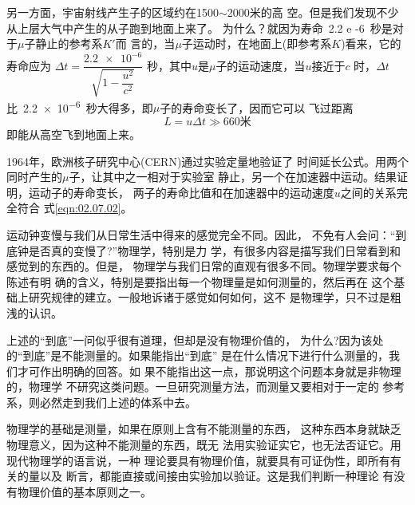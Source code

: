\vspace{-0.2em}另一方面，宇宙射线产生子的区域约在1500$\sim$2000米的高
空。但是我们发现不少从上层大气中产生的从子跑到地面上来了。
为什么？就因为寿命~\num{2.2 e -6}~秒是对于$\mu$子静止的参考系$K'$而
言的，当$\mu$子运动时，在地面上(即参考系$K$)看来，它的寿命应为
$\Delta t = \dfrac { \num{2.2e-6}}{ \sqrt { 1 - \dfrac { u ^ 2 } { c ^ { 2 } } } }$
秒，其中$u$是$\mu$子的运动速度，当$u$接近于$c$
时，$\Delta t$比~\num{2.2e-6}~秒大得多，即$\mu$子的寿命变长了，因而它可以
飞过距离
\begin{equation*}
    L = u \Delta t \gg 660 \text{米}
\end{equation*}
即能从高空飞到地面上来。

1964年，欧洲核子研究中心(CERN)通过实验定量地验证了
时间延长公式。用两个同时产生的$\mu$子，让其中之一相对于实验室
静止，另一个在加速器中运动。结果证明，运动子的寿命变长，
两子的寿命比值和在加速器中的运动速度$u$之间的关系完全符合
式\eqref{eqn:02.07.02}。

运动钟变慢与我们从日常生活中得来的感觉完全不同。因此，
不免有人会问：“到底钟是否真的变慢了?”物理学，特别是力
学，有很多内容是描写我们日常看到和感觉到的东西的。但是，
物理学与我们日常的直观有很多不同。物理学要求每个陈述有明
确的含义，特别是要指出每一个物理量是如何测量的，然后再在
这个基础上研究规律的建立。一般地诉诸于感觉如何如何，这不
是物理学，只不过是粗浅的认识。

上述的“到底”一问似乎很有道理，但却是没有物理价值的，
为什么?因为该处的“到底”是不能测量的。如果能指出“到底”
是在什么情况下进行什么测量的，我们才可作出明确的回答。如
果不能指出这一点，那说明这个问题本身就是非物理的，物理学
不研究这类问题。一旦研究测量方法，而测量又要相对于一定的
参考系，则必然走到我们上述的体系中去。

物理学的基础是测量，如果在原则上含有不能测量的东西，
这种东西本身就缺乏物理意义，因为这种不能测量的东西，既无
法用实验证实它，也无法否证它。用现代物理学的语言说，一种
理论要具有物理价值，就要具有可证伪性，即所有有关的量以及
断言，都能直接或间接由实验加以验证。这是我们判断一种理论
有没有物理价值的基本原则之一。